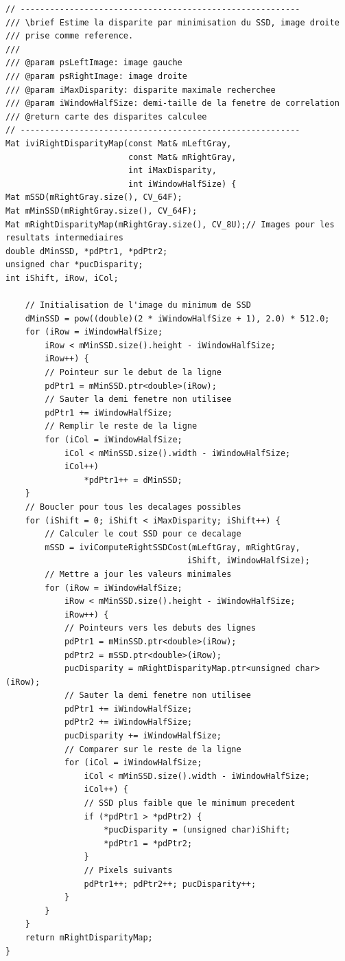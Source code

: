 \documentclass[a4paper]{article}
\begin{document}
\begin{lstlisting}
// ---------------------------------------------------------
/// \brief Estime la disparite par minimisation du SSD, image droite
/// prise comme reference.
///
/// @param psLeftImage: image gauche
/// @param psRightImage: image droite
/// @param iMaxDisparity: disparite maximale recherchee
/// @param iWindowHalfSize: demi-taille de la fenetre de correlation
/// @return carte des disparites calculee
// ---------------------------------------------------------
Mat iviRightDisparityMap(const Mat& mLeftGray,
                         const Mat& mRightGray,
                         int iMaxDisparity,
                         int iWindowHalfSize) {
Mat mSSD(mRightGray.size(), CV_64F);
Mat mMinSSD(mRightGray.size(), CV_64F);
Mat mRightDisparityMap(mRightGray.size(), CV_8U);// Images pour les resultats intermediaires
double dMinSSD, *pdPtr1, *pdPtr2;
unsigned char *pucDisparity;
int iShift, iRow, iCol;

    // Initialisation de l'image du minimum de SSD
    dMinSSD = pow((double)(2 * iWindowHalfSize + 1), 2.0) * 512.0;
    for (iRow = iWindowHalfSize;
        iRow < mMinSSD.size().height - iWindowHalfSize;
        iRow++) {
        // Pointeur sur le debut de la ligne
        pdPtr1 = mMinSSD.ptr<double>(iRow);
        // Sauter la demi fenetre non utilisee
        pdPtr1 += iWindowHalfSize;
        // Remplir le reste de la ligne
        for (iCol = iWindowHalfSize;
            iCol < mMinSSD.size().width - iWindowHalfSize;
            iCol++)
                *pdPtr1++ = dMinSSD;
    }
    // Boucler pour tous les decalages possibles
    for (iShift = 0; iShift < iMaxDisparity; iShift++) {
        // Calculer le cout SSD pour ce decalage
        mSSD = iviComputeRightSSDCost(mLeftGray, mRightGray,
                                     iShift, iWindowHalfSize);
        // Mettre a jour les valeurs minimales
        for (iRow = iWindowHalfSize;
            iRow < mMinSSD.size().height - iWindowHalfSize;
            iRow++) {
            // Pointeurs vers les debuts des lignes
            pdPtr1 = mMinSSD.ptr<double>(iRow);
            pdPtr2 = mSSD.ptr<double>(iRow);
            pucDisparity = mRightDisparityMap.ptr<unsigned char>(iRow);
            // Sauter la demi fenetre non utilisee
            pdPtr1 += iWindowHalfSize;
            pdPtr2 += iWindowHalfSize;
            pucDisparity += iWindowHalfSize;
            // Comparer sur le reste de la ligne
            for (iCol = iWindowHalfSize;
                iCol < mMinSSD.size().width - iWindowHalfSize;
                iCol++) {
                // SSD plus faible que le minimum precedent
                if (*pdPtr1 > *pdPtr2) {
                    *pucDisparity = (unsigned char)iShift;
                    *pdPtr1 = *pdPtr2;
                }
                // Pixels suivants
                pdPtr1++; pdPtr2++; pucDisparity++;
            }
        }
    }
    return mRightDisparityMap;
}
\end{lstlisting}
\end{document}
